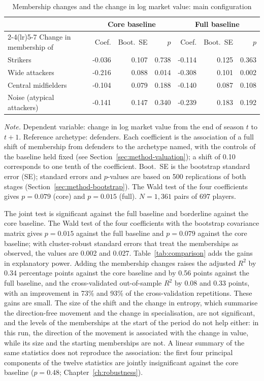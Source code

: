 \begin{table}[ht]
	\centering
	\small
	\caption{Membership changes and the change in log market value: main configuration}
	\label{tab:main}
	\begin{tabular}{lrrrrrr}
		\toprule
		 & \multicolumn{3}{c}{Core baseline} & \multicolumn{3}{c}{Full baseline} \\
		\cmidrule(lr){2-4}\cmidrule(lr){5-7}
		Change in membership of & Coef. & Boot.\ SE & $p$ & Coef. & Boot.\ SE & $p$ \\
		\midrule
Strikers & -0.036 & 0.107 & 0.738 & -0.114 & 0.125 & 0.363 \\
Wide attackers & -0.216 & 0.088 & 0.014 & -0.308 & 0.101 & 0.002 \\
Central midfielders & -0.104 & 0.079 & 0.188 & -0.140 & 0.087 & 0.108 \\
Noise (atypical attackers) & -0.141 & 0.147 & 0.340 & -0.239 & 0.183 & 0.192 \\
		\bottomrule
	\end{tabular}
	\par\smallskip
	\parbox{0.95\textwidth}{\footnotesize\emph{Note.} Dependent variable: change in log market value from the end of season $t$ to $t+1$. Reference archetype: defenders. Each coefficient is the association of a full shift of membership from defenders to the archetype named, with the controls of the baseline held fixed (see Section~\ref{sec:method-valuation}); a shift of 0.10 corresponds to one tenth of the coefficient. Boot.\ SE is the bootstrap standard error (SE); standard errors and $p$-values are based on 500 replications of both stages (Section~\ref{sec:method-bootstrap}). The Wald test of the four coefficients gives $p=0.079$ (core) and $p=0.015$ (full). $N=1{,}361$ pairs of 697 players.}
\end{table}

The joint test is significant against the full baseline and borderline against the core baseline. The Wald test of the four coefficients with the bootstrap covariance matrix gives $p=0.015$ against the full baseline and $p=0.079$ against the core baseline; with cluster-robust standard errors that treat the memberships as observed, the values are 0.002 and 0.027. Table~\ref{tab:comparison} adds the gains in explanatory power. Adding the membership changes raises the adjusted $R^2$ by 0.34 percentage points against the core baseline and by 0.56 points against the full baseline, and the cross-validated out-of-sample $R^2$ by 0.08 and 0.33 points, with an improvement in 73\% and 93\% of the cross-validation repetitions. These gains are small. The size of the shift and the change in entropy, which summarise the direction-free movement and the change in specialisation, are not significant, and the levels of the memberships at the start of the period do not help either: in this run, the direction of the movement is associated with the change in value, while its size and the starting memberships are not. A linear summary of the same statistics does not reproduce the association: the first four principal components of the twelve statistics are jointly insignificant against the core baseline ($p=0.48$; Chapter~\ref{ch:robustness}).

